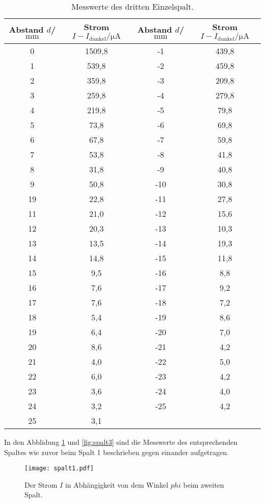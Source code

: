 \begin{table}
  \centering
  \caption{Messwerte des dritten Einzelspalt.}
  \label{tab:spalt3}
  \begin{tabular}{c c c c}
Abstand $d$/$\si{\milli\meter}$ & Strom $I-I_\mathrm{dunkel}/\si{\micro\ampere}$&Abstand $d$/$\si{\milli\meter}$ & Strom $I-I_\mathrm{dunkel}/\si{\micro\ampere}$\\
  \midrule
  0  & 1509,8 & -1 & 439,8\\
  1  & 539,8  & -2 & 459,8\\
  2  & 359,8  & -3 & 209,8\\
  3  & 259,8  & -4 & 279,8\\
  4  & 219,8  & -5 &  79,8\\
  5  & 73,8   & -6 &  69,8\\
  6  & 67,8   & -7 &  59,8\\
  7  & 53,8   & -8 &  41,8\\
  8  & 31,8   & -9 &  40,8\\
  9  & 50,8   & -10 & 30,8\\
  19 & 22,8   & -11 & 27,8\\
  11 & 21,0   & -12 & 15,6\\
  12 & 20,3   & -13 & 10,3\\
  13 & 13,5   & -14 & 19,3\\
  14 & 14,8   & -15 & 11,8\\
  15 & 9,5    & -16 &  8,8\\
  16 & 7,6    & -17 &  9,2\\
  17 & 7,6    & -18 &  7,2\\
  18 & 5,4    & -19 &  8,6\\
  19 & 6,4    & -20 &  7,0\\
  20 & 8,6    & -21 &  4,2\\
  21 & 4,0    & -22 &  5,0\\
  22 & 6,0    & -23 &  4,2\\
  23 & 3,6    & -24 &  4,0\\
  24 & 3,2    & -25 &  4,2\\
  25 & 3,1    &     &     \\
  \bottomrule
  \end{tabular}
\end{table}


In den Abblidung \ref{fig:spalt2} und \ref{fig:spalt3} sind
die Messwerte des entsprechenden Spaltes wie zuvor beim Spalt 1 beschrieben
gegen einander aufgetragen.


\begin{figure}
  \centering
  \texttt{[image: spalt1.pdf]}
  \caption{ Der Strom $I$ in Abhängigkeit von dem Winkel $phi$ beim zweiten Spalt.}
  \label{fig:spalt2}
\end{figure}


